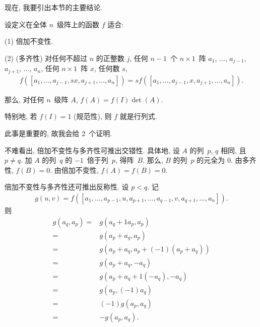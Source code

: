\documentclass[../libro.tex]{subfiles}
\begin{document}
现在, 我要引出本节的主要结论.

\begin{theorem}
    设定义在全体 \(n\)~级阵上的函数 \(f\) 适合:

    (1)
    倍加不变性.

    (2)
    (多齐性)
    对任何不超过 \(n\) 的正整数 \(j\),
    任何 \(n-1\)~个 \(n \times 1\)~阵
    \(a_1\), \(\dots\), \(a_{j-1}\),
    \(a_{j+1}\), \(\dots\), \(a_n\),
    任何 \(n \times 1\)~阵 \(x\),
    任何数 \(s\),
    \begin{align*}
        f([a_1, \dots, a_{j-1}, sx, a_{j+1}, \dots, a_n])
        = s f([a_1, \dots, a_{j-1}, x, a_{j+1}, \dots, a_n]).
    \end{align*}

    那么, 对任何 \(n\)~级阵 \(A\),
    \(f(A) = f(I) \det {(A)}\).

    特别地, 若 \(f(I) = 1\) (规范性),
    则 \(f\) 就是行列式.
\end{theorem}

此事是重要的, 故我会给 \(2\)~个证明.

\vspace{2ex}

不难看出, 倍加不变性与多齐性可推出交错性.
具体地, 设 \(A\) 的列~\(p\), \(q\) 相同,
且 \(p \neq q\).
加 \(A\) 的列~\(q\) 的 \(-1\)~倍于列~\(p\),
得阵~\(B\).
那么, \(B\) 的列~\(p\) 的元全为 \(0\).
由多齐性, \(f(B) = 0\).
由倍加不变性, \(f(A) = f(B) = 0\).

倍加不变性与多齐性还可推出反称性.
设 \(p < q\).
记
\begin{align*}
    g(u, v) =
    f([a_1, \dots, a_{p-1}, u, a_{p+1}, \dots,
    a_{q-1}, v, a_{q+1}, \dots, a_n]).
\end{align*}
则
\begin{align*}
    g(a_q, a_p)
    = {} & g(a_q + 1a_p, a_p)                   \\
    = {} & g(a_p + a_q, a_p)                    \\
    = {} & g(a_p + a_q, a_p + (-1) (a_p + a_q)) \\
    = {} & g(a_p + a_q, -a_q)                   \\
    = {} & g(a_p + a_q + 1 (-a_q), -a_q)        \\
    = {} & g(a_p, (-1) a_q)                     \\
    = {} & (-1) g(a_p, a_q)                     \\
    = {} & {-} g(a_p, a_q).
\end{align*}
\end{document}
